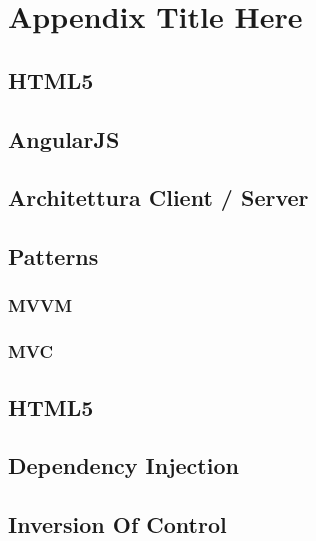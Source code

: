 
\chapter{Appendix Title Here} %

\label{AppendixA} %

\section{HTML5}
\section{AngularJS}
\section{Architettura Client / Server}
\section{Patterns}
\subsection{MVVM}
\subsection{MVC}
\section{HTML5}
\section{Dependency Injection}
\section{Inversion Of Control}